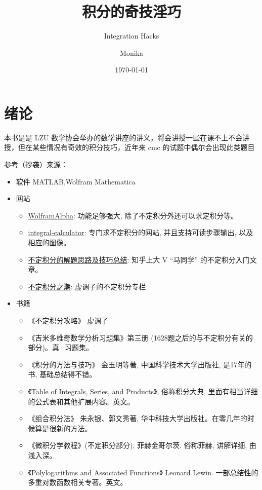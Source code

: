 \documentclass[lang=cn,newtx,10pt,scheme=chinese]{elegantbook}
\title{积分的奇技淫巧}
\subtitle{Integration Hacks}
\author{Monika}
\date{\today}
\begin{document}
\maketitle
\frontmatter

\tableofcontents

\chapter{绪论}
本书是是 LZU 数学协会举办的数学讲座的讲义，将会讲授一些在课不上不会讲授，但在某些情况有奇效的积分技巧，近年来 cmc 的试题中偶尔会出现此类题目

参考（抄袭）来源：
\begin{itemize}

  \item 软件 MATLAB,Wolfram Mathematica
  \item 网站
  \begin{itemize}
    \item \href{https://www.wolframalpha.com/}{WolframAlpha}: 功能足够强大, 除了不定积分外还可以求定积分等。
    \item \href{https://www.integral-calculator.com/}{integral-calculator}: 专门求不定积分的网站, 并且支持可读步骤输出, 以及相应的图像。
    \item \href{https://zhuanlan.zhihu.com/p/326288584}{不定积分的解题思路及技巧总结}: 知乎上大 V “马同学” 的不定积分入门文章。
    \item \href{https://www.zhihu.com/column/c_1108757962939727872}{不定积分之潮}: 虚调子的不定积分专栏
  \end{itemize}
  \item 书籍
  \begin{itemize}
    \item 《不定积分攻略》 虚调子
    \item 《吉米多维奇数学分析习题集》第三册 (1628题之后的与不定积分有关的部分)。真·习题集。
    \item 《积分的方法与技巧》 金玉明等著, 中国科学技术大学出版社, 是17年的书, 基础总结得不错。
    \item 《Table of Integrals, Series, and Products》, 俗称积分大典, 里面有相当详细的公式表和其他扩展内容。英文。
    \item 《组合积分法》 朱永银、郭文秀著, 华中科技大学出版社。在零几年的时候算是很新的方法。
    \item 《微积分学教程》(不定积分部分), 菲赫金哥尔茨. 俗称菲赫, 讲解详细, 由浅入深。
    \item 《Polylogarithms and Associated Functions》 Leonard Lewin. 一部总结性的多重对数函数相关专著。英文。
  \end{itemize}
\end{itemize}
\end{document}
